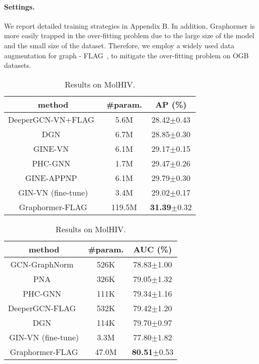\documentclass{article}
\begin{document}
\paragraph{Settings.} We report detailed training strategies in Appendix B. 
In addition, Graphormer is more easily trapped in the over-fitting problem due to the large size of the model and the small size of the dataset. Therefore, we employ a widely used data augmentation for graph - FLAG~\cite{kong2020flag}, to mitigate the over-fitting problem on OGB datasets.

\begin{table}[t]
\begin{minipage}{0.47\linewidth}
\centering
\small
\caption{Results on MolPCBA.}
\label{tab:pcba}
\begin{tabular}{c|c|c}
\toprule
  method   & \#param. & AP (\%) \\
  \hline
    DeeperGCN-{\scriptsize VN+FLAG}~\cite{li2020deepergcn} & 5.6M & 28.42$\pm$0.43\\
    DGN~\cite{beaini2020directional} & 6.7M & 28.85$\pm$0.30 \\
    GINE-{\scriptsize VN}~\cite{brossard2020graph} & 6.1M & 29.17$\pm$0.15 \\
    PHC-GNN~\cite{le2021parameterized} & 1.7M & 29.47$\pm$0.26 \\
    GINE-{\scriptsize APPNP}~\cite{brossard2020graph} & 6.1M & 29.79$\pm$0.30 \\
\hline
GIN-{\scriptsize VN}\cite{xu2018how} (fine-tune) &3.4M& 29.02$\pm$0.17 \\
\hline
Graphormer-{\scriptsize FLAG} &119.5M& \textbf{31.39}$\pm$0.32  \\
\bottomrule
\end{tabular}
\end{minipage}
\begin{minipage}{0.65\linewidth}
\centering
\small
\caption{Results on MolHIV.}
\label{tab:hiv}
\begin{tabular}{c|c|c}
\toprule
  method   & \#param. & AUC (\%) \\
  \hline
GCN-{\scriptsize GraphNorm}~\cite{brossard2020graph,cai2020graphnorm} & 526K & 78.83$\pm$1.00 \\
PNA~\cite{corso2020principal} & 326K & 79.05$\pm$1.32 \\
PHC-GNN~\cite{le2021parameterized} & 111K & 79.34$\pm$1.16 \\
DeeperGCN-{\scriptsize FLAG}~\cite{li2020deepergcn} & 532K & 79.42$\pm$1.20\\
DGN~\cite{beaini2020directional} & 114K & 79.70$\pm$0.97 \\
\hline
GIN-{\scriptsize VN}\cite{xu2018how} (fine-tune) &3.3M& 77.80$\pm$1.82 \\
\hline
Graphormer-{\scriptsize FLAG} &47.0M& \textbf{80.51}$\pm$0.53  \\
\bottomrule
\end{tabular}
\end{minipage}
\end{table}
\end{document}
